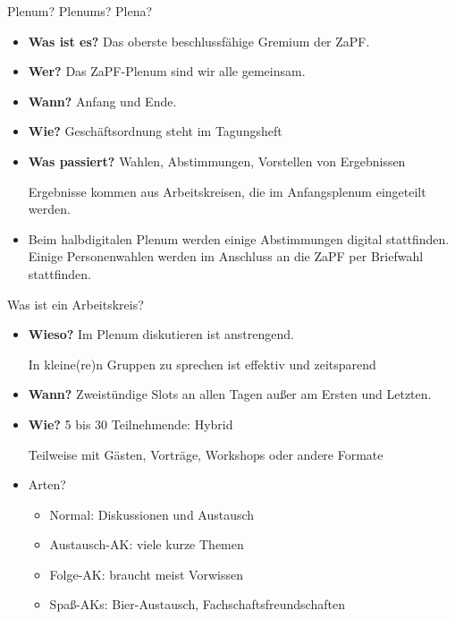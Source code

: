 \documentclass[compress,]{beamer}
\begin{document}
\begin{frame}{Plenum? Plenums? Plena?}

  \begin{itemize}[<+->]
  \item \textbf{Was ist es?} Das oberste beschlussfähige Gremium der ZaPF.
  \item \textbf{Wer?} Das ZaPF-Plenum sind wir alle gemeinsam.
  \item \textbf{Wann?} Anfang und Ende.
  \item \textbf{Wie?} Geschäftsordnung steht im Tagungsheft
  \item \textbf{Was passiert?} Wahlen, Abstimmungen, Vorstellen von Ergebnissen

    Ergebnisse kommen aus Arbeitskreisen, die im Anfangsplenum eingeteilt werden.
  \item Beim halbdigitalen Plenum werden einige Abstimmungen digital stattfinden. Einige Personenwahlen werden im Anschluss an die ZaPF per Briefwahl stattfinden.
  \end{itemize}


\end{frame}

\begin{frame}{Was ist ein Arbeitskreis?}

  \begin{itemize}[<+->]
  \item \textbf{Wieso?} Im Plenum diskutieren ist anstrengend.

    In kleine(re)n Gruppen zu sprechen ist effektiv und zeitsparend
  \item \textbf{Wann?} Zweistündige Slots an allen Tagen außer am Ersten und Letzten.
  \item \textbf{Wie?} 5 bis 30 Teilnehmende: Hybrid

    Teilweise mit Gästen, Vorträge, Workshops oder andere Formate

  \item Arten?
    \begin{itemize}[<+->]
    \item \glqq{}Normal\grqq{}: Diskussionen und Austausch
    \item Austausch-AK: viele kurze Themen
    \item Folge-AK: braucht meist Vorwissen
    \item Spaß-AKs: Bier-Austausch, Fachschaftsfreundschaften
    \end{itemize}
  \end{itemize}

\end{frame}
\end{document}
